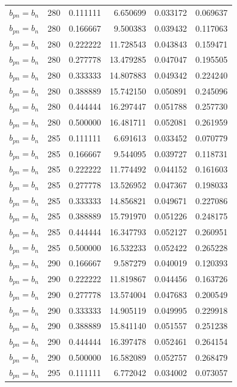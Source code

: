 \begin{longtable}{l r r r r r}
$b_{pn} = b_n$ & 280 & 0.111111 & 6.650699 & 0.033172 & 0.069637 \\
$b_{pn} = b_n$ & 280 & 0.166667 & 9.500383 & 0.039432 & 0.117063 \\
$b_{pn} = b_n$ & 280 & 0.222222 & 11.728543 & 0.043843 & 0.159471 \\
$b_{pn} = b_n$ & 280 & 0.277778 & 13.479285 & 0.047047 & 0.195505 \\
$b_{pn} = b_n$ & 280 & 0.333333 & 14.807883 & 0.049342 & 0.224240 \\
$b_{pn} = b_n$ & 280 & 0.388889 & 15.742150 & 0.050891 & 0.245096 \\
$b_{pn} = b_n$ & 280 & 0.444444 & 16.297447 & 0.051788 & 0.257730 \\
$b_{pn} = b_n$ & 280 & 0.500000 & 16.481711 & 0.052081 & 0.261959 \\
$b_{pn} = b_n$ & 285 & 0.111111 & 6.691613 & 0.033452 & 0.070779 \\
$b_{pn} = b_n$ & 285 & 0.166667 & 9.544095 & 0.039727 & 0.118731 \\
$b_{pn} = b_n$ & 285 & 0.222222 & 11.774492 & 0.044152 & 0.161603 \\
$b_{pn} = b_n$ & 285 & 0.277778 & 13.526952 & 0.047367 & 0.198033 \\
$b_{pn} = b_n$ & 285 & 0.333333 & 14.856821 & 0.049671 & 0.227086 \\
$b_{pn} = b_n$ & 285 & 0.388889 & 15.791970 & 0.051226 & 0.248175 \\
$b_{pn} = b_n$ & 285 & 0.444444 & 16.347793 & 0.052127 & 0.260951 \\
$b_{pn} = b_n$ & 285 & 0.500000 & 16.532233 & 0.052422 & 0.265228 \\
$b_{pn} = b_n$ & 290 & 0.166667 & 9.587279 & 0.040019 & 0.120393 \\
$b_{pn} = b_n$ & 290 & 0.222222 & 11.819867 & 0.044456 & 0.163726 \\
$b_{pn} = b_n$ & 290 & 0.277778 & 13.574004 & 0.047683 & 0.200549 \\
$b_{pn} = b_n$ & 290 & 0.333333 & 14.905119 & 0.049995 & 0.229918 \\
$b_{pn} = b_n$ & 290 & 0.388889 & 15.841140 & 0.051557 & 0.251238 \\
$b_{pn} = b_n$ & 290 & 0.444444 & 16.397478 & 0.052461 & 0.264154 \\
$b_{pn} = b_n$ & 290 & 0.500000 & 16.582089 & 0.052757 & 0.268479 \\
$b_{pn} = b_n$ & 295 & 0.111111 & 6.772042 & 0.034002 & 0.073057 \\

\end{longtable}
